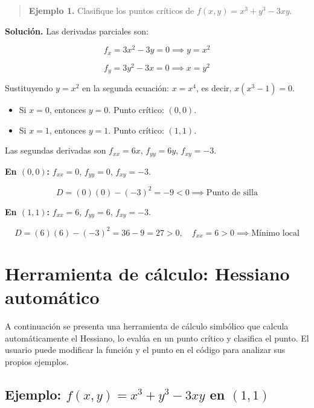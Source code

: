 \documentclass[
]{book}
\providecommand{\tightlist}{%
  \setlength{\itemsep}{0pt}\setlength{\parskip}{0pt}}
\begin{document}
\begin{quote}
\textbf{Ejemplo 1.} Clasifique los puntos críticos de \(f(x, y) = x^3 + y^3 - 3xy\).
\end{quote}

\textbf{Solución.} Las derivadas parciales son:

\[
f_x = 3x^2 - 3y = 0 \implies y = x^2
\]

\[
f_y = 3y^2 - 3x = 0 \implies x = y^2
\]

Sustituyendo \(y = x^2\) en la segunda ecuación: \(x = x^4\), es decir, \(x(x^3 - 1) = 0\).

\begin{itemize}
\tightlist
\item
  Si \(x = 0\), entonces \(y = 0\). Punto crítico: \((0, 0)\).
\item
  Si \(x = 1\), entonces \(y = 1\). Punto crítico: \((1, 1)\).
\end{itemize}

Las segundas derivadas son \(f_{xx} = 6x\), \(f_{yy} = 6y\), \(f_{xy} = -3\).

\textbf{En \((0, 0)\):} \(f_{xx} = 0\), \(f_{yy} = 0\), \(f_{xy} = -3\).

\[
D = (0)(0) - (-3)^2 = -9 < 0 \implies \text{Punto de silla}
\]

\textbf{En \((1, 1)\):} \(f_{xx} = 6\), \(f_{yy} = 6\), \(f_{xy} = -3\).

\[
D = (6)(6) - (-3)^2 = 36 - 9 = 27 > 0, \quad f_{xx} = 6 > 0 \implies \text{Mínimo local}
\]

\section{Herramienta de cálculo: Hessiano automático}\label{herramienta-de-cuxe1lculo-hessiano-automuxe1tico}

A continuación se presenta una herramienta de cálculo simbólico que calcula automáticamente el Hessiano, lo evalúa en un punto crítico y clasifica el punto. El usuario puede modificar la función y el punto en el código para analizar sus propios ejemplos.

\subsection{\texorpdfstring{Ejemplo: \(f(x, y) = x^3 + y^3 - 3xy\) en \((1, 1)\)}{Ejemplo: f(x, y) = x\^{}3 + y\^{}3 - 3xy en (1, 1)}}\label{ejemplo-fx-y-x3-y3---3xy-en-1-1}
\end{document}
